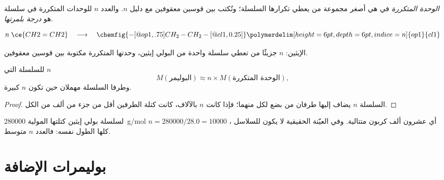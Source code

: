 \begin{definition}\label{def:g12:polymers:repeat-unit}
\emph{الوحدة المتكررة} في  هي أصغر
مجموعة من  يعطي تكرارها السلسلة؛ وتُكتب بين
قوسين معقوفين مع دليل $n$. والعدد $n$ للوحدات المتكررة في سلسلة هو
\emph{درجة بلمرتها}.
\end{definition}

\begin{omfigure}
\[
  n\;\ce{CH2=CH2}
  \quad\longrightarrow\quad
  \chemfig{-[@{op1,.75}]CH_2-CH_2-[@{cl1,0.25}]}
  \polymerdelim[height=6pt, depth=6pt, indice=n]{op1}{cl1}
\]

{\small {} الإيثين: $n$ جزيئًا من  تعطي سلسلة
واحدة من البولي إيثين، وحدتها المتكررة  مكتوبة بين
قوسين معقوفين.}
\end{omfigure}

\begin{proposition}\label{prop:g12:polymers:molar-mass}
للسلسلة التي  $n$ 
\[
  M(\text{البوليمر}) \approx n \times M(\text{الوحدة المتكررة}) ,
\]
وطرفا السلسلة مهملان حين تكون $n$ كبيرة.
\end{proposition}

\begin{proof}
السلسلة $n$  يضاف إليها طرفان من بضع  لكل منهما؛
فإذا كانت $n$ بالآلاف، كانت كتلة الطرفين أقل من جزء من ألف من
الكل.
\end{proof}

\begin{example}\label{ex:g12:polymers:pe}
لسلسلة بولي إيثين كتلتها المولية \qty{280000}{g/mol}
$n = 280000/28.0 = 10000$ ، أي عشرون ألف  كربون
متتالية. وفي العيّنة الحقيقية لا يكون للسلاسل كلها الطول نفسه:
فالعدد $n$ متوسط.
\end{example}

\section{بوليمرات الإضافة}

